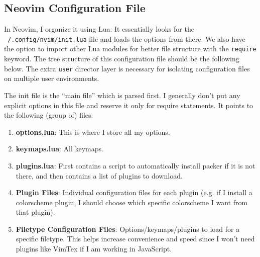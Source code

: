 \documentclass{article}
\begin{document}
  \subsection{Neovim Configuration File}

    In Neovim, I organize it using Lua. It essentially looks for the \texttt{~/.config/nvim/init.lua} file and loads the options from there. We also have the option to import other Lua modules for better file structure with the \texttt{require} keyword. The tree structure of this configuration file should be the following below. The extra \texttt{user} director layer is necessary for isolating configuration files on multiple user environments.  
    
    The init file is the ``main file'' which is parsed first. I generally don't put any explicit options in this file and reserve it only for require statements. It points to the following (group of) files: 
    \begin{enumerate}
      \item \textbf{options.lua}: This is where I store all my options. 
      \item \textbf{keymaps.lua}: All keymaps. 
      \item \textbf{plugins.lua}: First contains a script to automatically install packer if it is not there, and then contains a list of plugins to download. 
      \item \textbf{Plugin Files}: Individual configuration files for each plugin (e.g. if I install a colorscheme plugin, I should choose which specific colorscheme I want from that plugin). 
      \item \textbf{Filetype Configuration Files}: Options/keymaps/plugins to load for a specific filetype. This helps increase convenience and speed since I won't need plugins like VimTex if I am working in JavaScript. 
    \end{enumerate}
\end{document}
